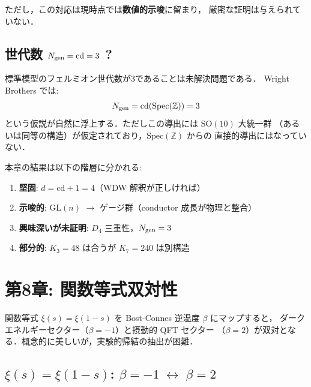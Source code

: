ただし，この対応は現時点では\textbf{数値的示唆}に留まり，
厳密な証明は与えられていない．

\subsection{世代数 $N_{\rm gen} = \mathrm{cd} = 3$ ?}

標準模型のフェルミオン世代数が3であることは未解決問題である．
Wright Brothers では:
\begin{equation}
N_{\rm gen} = \mathrm{cd}(\mathrm{Spec}(\mathbb{Z})) = 3
\end{equation}
という仮説が自然に浮上する．ただしこの導出には $\mathrm{SO}(10)$ 大統一群
（あるいは同等の構造）が仮定されており，$\mathrm{Spec}(\mathbb{Z})$ からの
直接的導出にはなっていない．

\begin{warningbox}[正直な評価]
本章の結果は以下の階層に分かれる:
\begin{enumerate}
\item \textbf{堅固}: $d = \mathrm{cd} + 1 = 4$（WDW 解釈が正しければ）
\item \textbf{示唆的}: $\mathrm{GL}(n)$ $\to$ ゲージ群（conductor 成長が物理と整合）
\item \textbf{興味深いが未証明}: $D_4$ 三重性，$N_{\rm gen} = 3$
\item \textbf{部分的}: $K_3 = 48$ は合うが $K_7 = 240$ は別構造
\end{enumerate}
\end{warningbox}

\newpage
\section{第8章: 関数等式双対性}

\begin{statusbox}
関数等式 $\xi(s) = \xi(1-s)$ を Bost-Connes 逆温度 $\beta$ にマップすると，
ダークエネルギーセクター（$\beta = -1$）と摂動的 QFT セクター
（$\beta = 2$）が双対となる．概念的に美しいが，実験的帰結の抽出が困難．
\end{statusbox}

\subsection{$\xi(s) = \xi(1-s)$: $\beta = -1 \;\leftrightarrow\; \beta = 2$}

